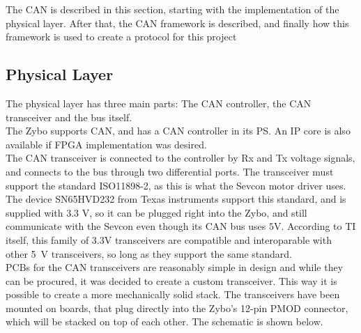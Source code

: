 \label{sec:CANbus}
The CAN is described in this section, starting with the implementation of the physical layer.
After that, the CAN framework is described, and finally how this framework is used to create a protocol for this project

\subsection{Physical Layer}\label{sub:CANphys}
The physical layer has three main parts: The CAN controller, the CAN transceiver and the bus itself. \\

The Zybo supports CAN, and has a CAN controller in its PS.
An IP core is also available if FPGA implementation was desired.\\

The CAN transceiver is connected to the controller by Rx and Tx voltage signals, and connects to the bus through two differential ports. 
The transceiver must support the standard ISO11898-2, as this is what the Sevcon motor driver uses.
The device SN65HVD232 from Texas instruments support this standard, and is supplied with 3.3 V, so it can be plugged right into the Zybo, and still communicate with the Sevcon even though its CAN bus uses $\si{5 \volt}$.
According to TI itself\cite{3.3V_CAN}, this family of $\si{3.3 \volt}$ transceivers are compatible and interoparable with other \si{5 \volt} transceivers, so long as they support the same standard.\\

PCBs for the CAN transceivers are reasonably simple in design and while they can be procured, it was decided to create a custom transceiver.
This way it is possible to create a more mechanically solid stack.
The transceivers have been mounted on boards, that plug directly into the Zybo's 12-pin PMOD connector, which will be stacked on top of each other. 
The schematic is shown below.

